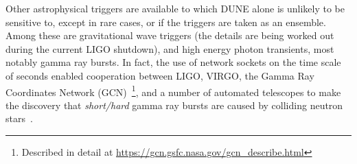 
Other astrophysical triggers are available to which DUNE alone is unlikely to be sensitive to, except in rare cases, or if the triggers are taken as an ensemble. 
 Among these are gravitational wave triggers %
 (the details are being worked
out during the current LIGO shutdown), and high energy photon
transients, most notably gamma ray bursts.
In fact, the use of network sockets on the time scale of seconds
enabled cooperation between LIGO, VIRGO, the Gamma Ray Coordinates
Network (GCN)~\footnote{Described in detail at
  \url{https://gcn.gsfc.nasa.gov/gcn_describe.html}}, and a number of
automated telescopes to make the discovery that \textit{short/hard} gamma ray bursts are caused by colliding neutron stars~\cite{kilonova}.
